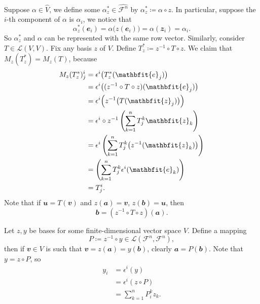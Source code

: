 \documentclass[math, code]{amznotes}
\theoremstyle{remark}
\begin{document}
Suppose $\alpha \in \hat{V}$, we define some $\alpha^*_z \in \hat{\mathcal{F}^n}$ by $\alpha^*_z \coloneqq \alpha \circ z$. In particular, suppose the $i$-th component of $\alpha$ is $\alpha_i$, we notice that
\begin{equation*}
    \alpha^*_z(\mathbfit{e}_i) = \alpha\bigl(z(\mathbfit{e}_i)\bigr) = \alpha(\mathbfit{z}_i) = \alpha_i.
\end{equation*}
So $\alpha^*_z$ and $\alpha$ can be represented with the same row vector. Similarly, consider $T \in \mathcal{L}(V, V)$. Fix any basis $z$ of $V$. Define $T^*_z \coloneqq z^{-1} \circ T \circ z$. We claim that $M_z(T^*_z) = M_z(T)$, because
\begin{align*}
    M_z(T^*_z)^i_j & = \epsilon^i\bigl(T^*_z(\mathbfit{e}_j)\bigr) \\
    & = \epsilon^i\bigl((z^{-1} \circ T \circ z)(\mathbfit{e}_j)\bigr) \\
    & = \epsilon^i\Bigl(z^{-1}\bigl(T(\mathbfit{z}_j)\bigr)\Bigr) \\
    & = \epsilon^i \circ z^{-1}\left(\sum_{k = 1}^{n}T^k_j\mathbfit{z}_k\right) \\
    & = \epsilon^i\left(\sum_{k = 1}^{n}T^k_j\bigl(z^{-1}(\mathbfit{z}_k)\bigr)\right) \\
    & = \left(\sum_{k = 1}^{n}T^k_j\epsilon^i(\mathbfit{e}_k)\right) \\
    & = T^i_j.
\end{align*}
Note that if $\mathbfit{u} = T(\mathbfit{v})$ and $z(\mathbfit{a}) = \mathbfit{v}$, $z(\mathbfit{b}) = \mathbfit{u}$, then 
\begin{equation*}
    \mathbfit{b} = \left(z^{-1} \circ T \circ z\right)(\mathbfit{a}).
\end{equation*}

Let $z, y$ be bases for some finite-dimensional vector space $V$. Define a mapping
\begin{equation*}
    P \coloneqq z^{-1} \circ y \in \mathcal{L}\left(\mathcal{F}^n, \mathcal{F}^n\right),
\end{equation*}
then if $\mathbfit{v} \in V$ is such that $\mathbfit{v} = z(\mathbfit{a}) = y(\mathbfit{b})$, clearly $\mathbfit{a} = P(\mathbfit{b})$. Note that $y = z \circ P$, so
\begin{align*}
    y_i & = \epsilon^i(y) \\
    & = \epsilon^i(z \circ P) \\
    & = \sum_{k = 1}^{n}P^k_iz_k.
\end{align*} 
\end{document}

